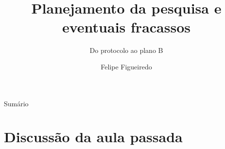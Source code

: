 \documentclass{beamer}
\title%
{Planejamento da pesquisa e eventuais fracassos}
\subtitle
{Do protocolo ao plano B} %
\author%
{Felipe Figueiredo}%
\institute[] %
{
}
\date%
{}
\begin{document}
\begin{frame}
  \titlepage
\end{frame}

\begin{frame}{Sumário}
  \tableofcontents
\end{frame}








\section{Discussão da aula passada}
\end{document}
